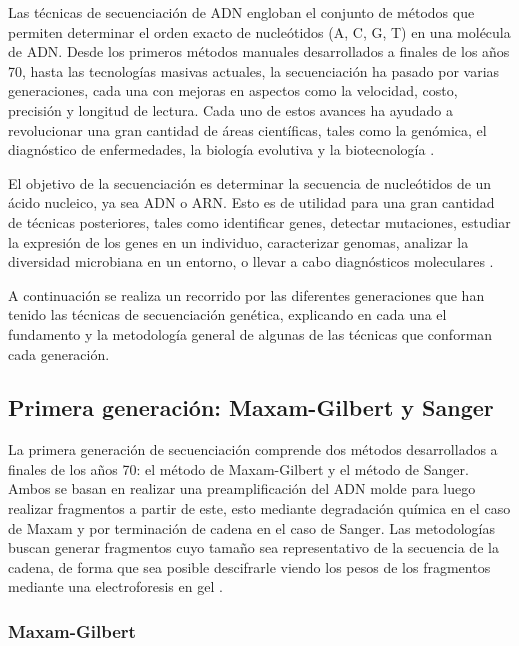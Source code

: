 \documentclass{AsignaturaResumen}
\begin{document}
Las técnicas de secuenciación de ADN engloban el conjunto de métodos que permiten determinar el orden exacto de nucleótidos (A, C, G, T) en una molécula de ADN. Desde los primeros métodos manuales desarrollados a finales de los años 70, hasta las tecnologías masivas actuales, la secuenciación ha pasado por varias generaciones, cada una con mejoras en aspectos como la velocidad, costo, precisión y longitud de lectura. Cada uno de estos avances ha ayudado a revolucionar una gran cantidad de áreas científicas, tales como la genómica, el diagnóstico de enfermedades, la biología evolutiva y la biotecnología \citep{erenDNASequencingMethods2022}.

El objetivo de la secuenciación es determinar la secuencia de nucleótidos de un ácido nucleico, ya sea ADN o ARN. Esto es de utilidad para una gran cantidad de técnicas posteriores, tales como identificar genes, detectar mutaciones, estudiar la expresión de los genes en un individuo, caracterizar genomas, analizar la diversidad microbiana en un entorno, o llevar a cabo diagnósticos moleculares \citep{erenDNASequencingMethods2022}.

\bigskip

A continuación se realiza un recorrido por las diferentes generaciones que han tenido las técnicas de secuenciación genética, explicando en cada una el fundamento y la metodología general de algunas de las técnicas que conforman cada generación.



\subsection[Primera generación]{Primera generación: Maxam-Gilbert y Sanger}

La primera generación de secuenciación comprende dos métodos desarrollados a finales de los años 70: el método de Maxam-Gilbert y el método de Sanger. Ambos se basan en realizar una preamplificación del ADN molde para luego realizar fragmentos a partir de este, esto mediante degradación química en el caso de Maxam y por terminación de cadena en el caso de Sanger. Las metodologías buscan generar fragmentos cuyo tamaño sea representativo de la secuencia de la cadena, de forma que sea posible descifrarle viendo los pesos de los fragmentos mediante una electroforesis en gel \citep{erenDNASequencingMethods2022}.


\subsubsection{Maxam-Gilbert}
\end{document}
